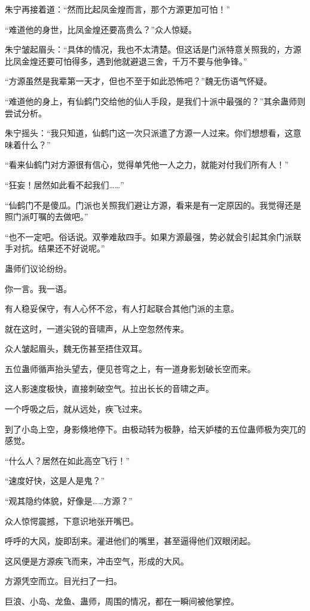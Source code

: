 \begin{this_body}
朱宁再接着道：“然而比起凤金煌而言，那个方源更加可怕！”

“难道他的身世，比凤金煌还要高贵么？”众人惊疑。

朱宁皱起眉头：“具体的情况，我也不太清楚。但这话是门派特意关照我的，方源比凤金煌还要可怕得多，遇到他就避退三舍，千万不要与他争锋。”

“方源虽然是我辈第一天才，但也不至于如此恐怖吧？”魏无伤语气怀疑。

“难道他的身上，有仙鹤门交给他的仙人手段，是我们十派中最强的？”其余蛊师则尝试分析。

朱宁摇头：“我只知道，仙鹤门这一次只派遣了方源一人过来。你们想想看，这意味着什么？”

“看来仙鹤门对方源很有信心，觉得单凭他一人之力，就能对付我们所有人！”

“狂妄！居然如此看不起我们……”

“仙鹤门不是傻瓜。门派也关照我们避让方源，看来是有一定原因的。我觉得还是照门派叮嘱的去做吧。”

“也不一定吧。俗话说。双拳难敌四手。如果方源最强，势必就会引起其余门派联手对抗。结果还不好说呢。”

蛊师们议论纷纷。

你一言。我一语。

有人稳妥保守，有人心怀不忿，有人打起联合其他门派的主意。

就在这时，一道尖锐的音啸声，从上空忽然传来。

众人皱起眉头，魏无伤甚至捂住双耳。

五位蛊师循声抬头望去，便见苍穹之上，有一道身影划破长空而来。

这人影速度极快，直接刺破空气。拉出长长的音啸之声。

一个呼吸之后，就从远处，疾飞过来。

到了小岛上空，身影倏地停下。由极动转为极静，给天妒楼的五位蛊师极为突兀的感觉。

“什么人？居然在如此高空飞行！”

“速度好快，这是人是鬼？”

“观其隐约体貌，好像是……方源？”

众人惊愕震撼，下意识地张开嘴巴。

呼呼的大风，旋即刮来。灌进他们的嘴里，甚至逼得他们双眼闭起。

这风便是方源疾飞而来，冲击空气，形成的大风。

方源凭空而立。目光扫了一扫。

巨浪、小岛、龙鱼、蛊师，周围的情况，都在一瞬间被他掌控。


\end{this_body}
